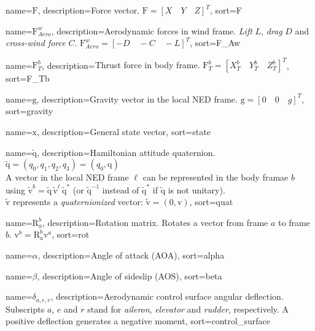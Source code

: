 {
	name={$\bm{\mathrm{F}}$},
	description={Force vector. $\bm{\mathrm{F}} = [X \quad Y \quad Z]^T$},
	sort=F
}

{
	name={$\bm{\mathrm{F}}_{Aero}^w$},
	description={Aerodynamic forces in wind frame. \textit{Lift} $L$, \textit{drag} $D$ and \textit{cross-wind force} $C$. $\bm{\mathrm{F}}_{Aero}^w = [-D \quad -C \quad -L]^T$},
	sort=F_Aw
}

{
	name={$\bm{\mathrm{F}}_T^b$},
	description={Thrust force in body frame. $\bm{\mathrm{F}}_T^b = [X_T^b \quad Y_T^b \quad Z_T^b]^T$},
	sort=F_Tb
}

{
	name={$\bm{\mathrm{g}}$},
	description={Gravity vector in the local NED frame. $\bm{\mathrm{g}} = [0 \quad 0 \quad g]^T$},
	sort=gravity
}

{
	name={$\bm{\mathrm{x}}$},
	description={General state vector},
	sort=state
}

{
	name={$\bm{\mathrm{\tilde{q}}}$},
	description={Hamiltonian attitude quaternion.
				 $\bm{\mathrm{\tilde{q}}} = (q_0, q_1, q_2, q_3) = (q_0, \bm{\mathrm{q}})$\\
				 A vector in the local NED frame $\ell$ can be represented in the body framae $b$ using
				 $\bm{\mathrm{\tilde{v}}}^b = \bm{\mathrm{\tilde{q}}} \, \bm{\mathrm{\tilde{v}}}^\ell \, \bm{\mathrm{\tilde{q}}}^*$ (or $\bm{\mathrm{\tilde{q}}}^{-1}$
				 instead of $\bm{\mathrm{\tilde{q}}}^*$ if $\bm{\mathrm{\tilde{q}}}$ is not unitary).\\
				 $\bm{\mathrm{\tilde{v}}}$ represents a \textit{quaternionized} vector: $\bm{\mathrm{\tilde{v}}} = (0,\bm{\mathrm{v}})$},
	sort=quat
}

{
	name={$\bm{\mathrm{R}}_a^b$},
	description={Rotation matrix. Rotates a vector from frame $a$ to frame $b$. $\bm{\mathrm{v}}^b = \bm{\mathrm{R}}_a^b \bm{\mathrm{v}}^a$},
	sort=rot
}

{
	name={$\alpha$},
	description={Angle of attack (AOA)},
	sort=alpha
}

{
	name={$\beta$},
	description={Angle of sideslip (AOS)},
	sort=beta
}

{
	name={$\delta_{a,e,r}$},
	description={Aerodynamic control surface angular deflection. Subscripts $a$, $e$ and $r$ stand for \textit{aileron}, \textit{elevator} and \textit{rudder}, respectively. A positive deflection generates a negative moment},
	sort=control_surface
}

